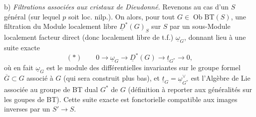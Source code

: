 \documentclass[11pt,a4paper]{article}
\begin{document}
b) \emph{Filtrations associées aux cristaux de Dieudonné.} Revenons au cas d'un $S$ général (sur lequel $p$ soit loc. nilp.). On  alors, pour tout $G \in \operatorname{Ob} \mathrm{BT}(S)$, une filtration \struck{\ill{}} du Module localement libre $\underline{D}^{*}(G)_{S}$ sur $S$ par un sous-Module localement facteur direct (donc localement libre de t.f.)  $\underline{\omega}_{G}$, donnant lieu à une suite exacte
\[
  (*) \qquad 0 \longrightarrow \underline{\omega}_{G} \longrightarrow \underline{D}^{*}(G) \longrightarrow \underline{t}_{G^{*}} \longrightarrow 0 ,
\]
où en fait $\underline{\omega}_{G}$ est le module des différentielles invariantes sur le groupe formel $\overline{G} \subset G$ associé à $G$ (qui sera construit plus bas), et $\underline{t}_{G} = \underline{\omega}_{G^{*}}^{\vee}$ est l'Algèbre de Lie associée au groupe de BT dual $G^{*}$ de $G$ (définition à reporter aux généralités sur les goupes de BT). Cette  suite exacte est fonctorielle   compatible aux images inverses par un $S' \to S$.

\end{document}
